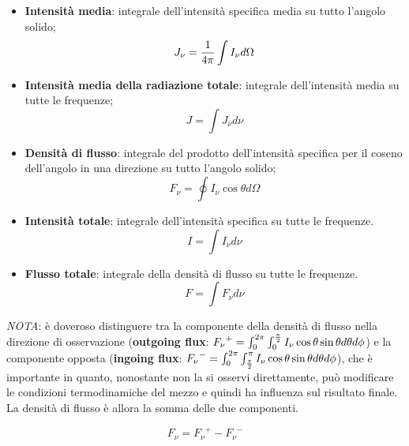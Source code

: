 \documentclass[a4paper,11pt]{article}
\begin{document}
\begin{itemize}
    \item \textbf{Intensità media}: integrale dell'intensità specifica media su tutto l'angolo solido; 
    \begin{displaymath}
        {J_\nu} = {1 \over 4\pi} \int {I_\nu} d\Omega
    \end{displaymath}
    \item \textbf{Intensità media della radiazione totale}: integrale dell'intensità media su tutte le frequenze;
    \begin{displaymath}
        J = \int {J_\nu} d\nu
    \end{displaymath}
    \item \textbf{Densità di flusso}: integrale del prodotto dell'intensità specifica per il coseno dell'angolo in una direzione su tutto l'angolo solido;
    \begin{displaymath}
        {F_\nu} = \oint {I_\nu} \cos{\theta} d\Omega
    \end{displaymath}
    \item \textbf{Intensità totale}: integrale dell'intensità specifica su tutte le frequenze.
    \begin{displaymath}
        I = \int {I_\nu} d\nu
    \end{displaymath}
    \item \textbf{Flusso totale}: integrale della densità di flusso su tutte le frequenze.
    \begin{displaymath}
        F = \int {F_\nu} d\nu
    \end{displaymath}
\end{itemize}
\textit{NOTA}: è doveroso distinguere tra la componente della densità di flusso nella direzione di osservazione (\textbf{outgoing flux}: ${{F_\nu}^{+}} = \int_{0}^{2\pi} \int_{0}^{{\pi \over 2}} {I_\nu} \cos{\theta} \sin{\theta} d\theta d\phi$) e la componente opposta (\textbf{ingoing flux}: ${{F_\nu}^{-}} = \int_{0}^{2\pi} \int_{{\pi \over 2}}^{\pi} {I_\nu} \cos{\theta} \sin{\theta} d\theta d\phi$), che è importante in quanto, nonostante non la si osservi direttamente, può modificare le condizioni termodinamiche del mezzo e quindi ha influenza sul risultato finale. \\ La densità di flusso è allora la somma delle due componenti.

\begin{displaymath}
    {F_\nu} = {{F_\nu}^{+}} - {{F_\nu}^{-}}
\end{displaymath}
\end{document}
